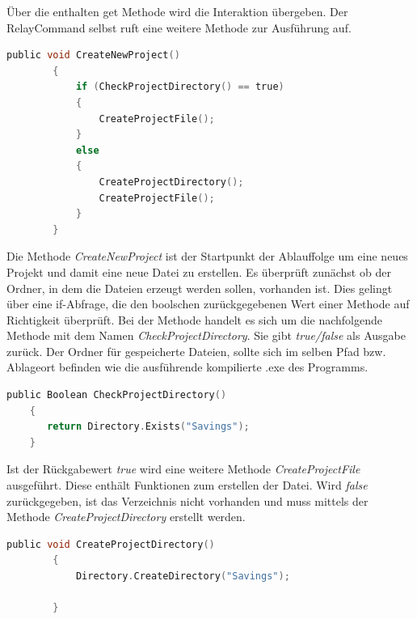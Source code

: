 Über die enthalten get Methode wird die Interaktion übergeben. Der RelayCommand selbst ruft eine weitere Methode zur Ausführung auf.
\\
\begin{lstlisting}[language=C,
    frame=single,           % Ein Rahmen um den Code
    framexleftmargin=15pt,  % Rahmen link von den Zahlen
    style=algoBericht,
    label={CreateNewProject},
    captionpos=b,           % Caption unter den Code setzen
    caption={CreateNewProject}]
    public void CreateNewProject()
        {
            if (CheckProjectDirectory() == true)
            {
                CreateProjectFile();
            }
            else
            {
                CreateProjectDirectory();
                CreateProjectFile();
            }
        }

\end{lstlisting}
Die Methode \textit{CreateNewProject} ist der Startpunkt der Ablauffolge um eine neues Projekt und damit eine neue Datei zu erstellen. 
Es überprüft zunächst ob der Ordner, in dem die Dateien erzeugt werden sollen, vorhanden ist. Dies gelingt über eine if-Abfrage, die den 
boolschen zurückgegebenen Wert einer Methode auf Richtigkeit überprüft. Bei der Methode handelt es sich um die nachfolgende Methode mit 
dem Namen \textit{CheckProjectDirectory}. Sie gibt \textit{true/false} als Ausgabe zurück. Der Ordner für gespeicherte Dateien, sollte 
sich im selben Pfad bzw. Ablageort befinden wie die ausführende kompilierte .exe des Programms. 
\pagebreak
\begin{lstlisting}[language=C,
    frame=single,           % Ein Rahmen um den Code
    framexleftmargin=15pt,  % Rahmen link von den Zahlen
    style=algoBericht,
    label={CheckProjectDirectory},
    captionpos=b,           % Caption unter den Code setzen
    caption={CheckProjectDirectory}]
    public Boolean CheckProjectDirectory()
    {
       return Directory.Exists("Savings");
    }

\end{lstlisting}
Ist der Rückgabewert \textit{true} wird eine weitere Methode \textit{CreateProjectFile} ausgeführt. Diese enthält Funktionen zum 
erstellen der Datei. Wird \textit{false} zurückgegeben, ist das Verzeichnis nicht vorhanden und muss mittels der Methode 
\textit{CreateProjectDirectory} erstellt werden. 
\\
\begin{lstlisting}[language=C,
    frame=single,           % Ein Rahmen um den Code
    framexleftmargin=15pt,  % Rahmen link von den Zahlen
    style=algoBericht,
    label={CreateProjectDirectory},
    captionpos=b,           % Caption unter den Code setzen
    caption={CreateProjectDirectory}]
    public void CreateProjectDirectory()
        {
            Directory.CreateDirectory("Savings");

        }
\end{lstlisting}
